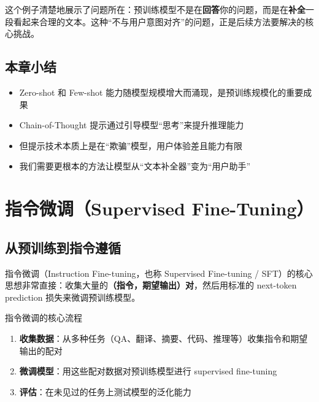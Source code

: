 \documentclass[a4paper]{article}
\begin{document}



这个例子清楚地展示了问题所在：预训练模型不是在\textbf{回答}你的问题，而是在\textbf{补全}一段看起来合理的文本。这种``不与用户意图对齐''的问题，正是后续方法要解决的核心挑战。

\subsection{本章小结}

\begin{itemize}
    \item Zero-shot 和 Few-shot 能力随模型规模增大而涌现，是预训练规模化的重要成果
    \item Chain-of-Thought 提示通过引导模型``思考''来提升推理能力
    \item 但提示技术本质上是在``欺骗''模型，用户体验差且能力有限
    \item 我们需要更根本的方法让模型从``文本补全器''变为``用户助手''
\end{itemize}


\section{指令微调（Supervised Fine-Tuning）}

\subsection{从预训练到指令遵循}

指令微调（Instruction Fine-tuning，也称 Supervised Fine-tuning / SFT）的核心思想非常直接：收集大量的\textbf{（指令，期望输出）对}，然后用标准的 next-token prediction 损失来微调预训练模型。





\begin{importantbox}{指令微调的核心流程}
\begin{enumerate}
    \item \textbf{收集数据}：从多种任务（QA、翻译、摘要、代码、推理等）收集指令和期望输出的配对
    \item \textbf{微调模型}：用这些配对数据对预训练模型进行 supervised fine-tuning
    \item \textbf{评估}：在未见过的任务上测试模型的泛化能力
\end{enumerate}
\end{importantbox}
\end{document}
